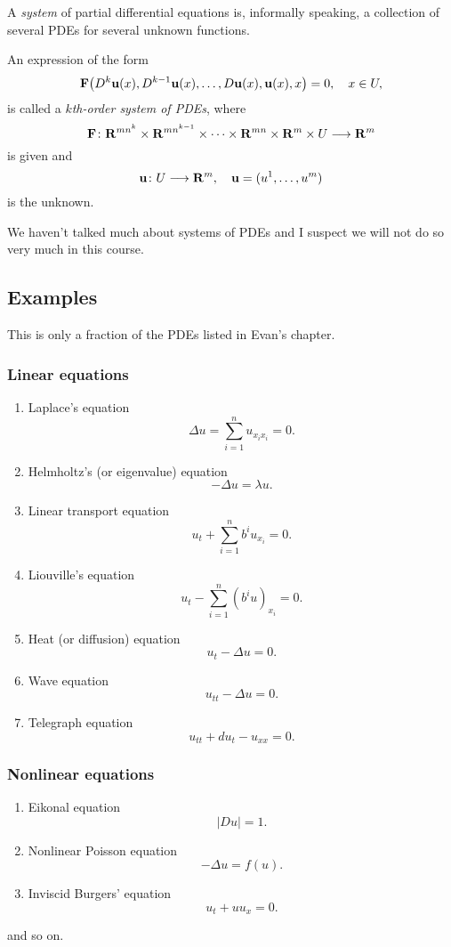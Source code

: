 A \emph{system} of partial differential equations is, informally speaking,
a collection of several PDEs for several unknown functions.

\begin{definition}
  An expression of the form
  \begin{equation}
    \label{eq:pde:k-order-system}
    \mathbf{F}\bigl(D^k\mathbf{u}(x),D^{k-1}\mathbf{u}(x),\dotsc,D\mathbf{u}(x),\mathbf{u}(x),x\bigr)=0,
    \quad x\in U,
  \end{equation}
  is called a \emph{\(k\)th-order system of PDEs}, where
  \[
    \mathbf{F}\colon\mathbf{R}^{mn^k}\times\mathbf{R}^{mn^{k-1}}\times\dotsb\times\mathbf{R}^{mn}\times\mathbf{R}^m\times
    U\longrightarrow\mathbf{R}^m
  \]
  is given and
  \[
    \mathbf{u}\colon U\longrightarrow\mathbf{R}^m,\quad\mathbf{u}=(u^1,\dotsc,u^m)
  \]
  is the unknown.
\end{definition}
\begin{remark}
  We haven't talked much about systems of PDEs and I suspect we will not do
  so very much in this course.
\end{remark}
\subsection{Examples}
This is only a fraction of the PDEs listed in Evan's chapter.

\subsubsection{Linear equations}
\begin{enumerate}[label=\arabic*.,noitemsep]
\item Laplace's equation
  \[
    \Delta u=\sum_{i=1}^n u_{x_ix_i}=0.
  \]
\item Helmholtz's (or eigenvalue) equation
  \[
    -\Delta u=\lambda u.
  \]
\item Linear transport equation
  \[
    u_t+\sum_{i=1}^n b^iu_{x_i}=0.
  \]
\item Liouville's equation
  \[
    u_t-\sum_{i=1}^n(b^iu)_{x_i}=0.
  \]
\item Heat (or diffusion) equation
  \[
    u_t-\Delta u=0.
  \]
\item Wave equation
  \[
    u_{tt}-\Delta u=0.
  \]
\item Telegraph equation
  \[
    u_{tt}+du_t-u_{xx}=0.
  \]
\end{enumerate}
\subsubsection{Nonlinear equations}
\begin{enumerate}[label=\arabic*.,noitemsep]
\item Eikonal equation
  \[
    |Du|=1.
  \]
\item Nonlinear Poisson equation
  \[
    -\Delta u=f(u).
  \]
\item Inviscid Burgers' equation
  \[
    u_t+uu_x=0.
  \]
\end{enumerate}
and so on.

